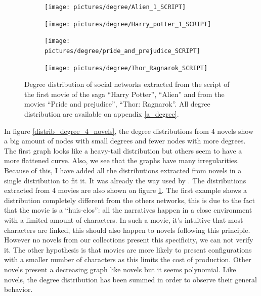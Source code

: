 \documentclass[a4paper, 12pt]{report}
\begin{document}
\begin{figure}
\begin{subfigure}{.49\textwidth}
\centering
\texttt{[image: pictures/degree/Alien\_1\_SCRIPT]}
\end{subfigure}
\hfill
\begin{subfigure}{.49\textwidth}
\centering
\texttt{[image: pictures/degree/Harry\_potter\_1\_SCRIPT]}
\end{subfigure}
\hfill
\begin{subfigure}{.49\textwidth}
\centering
\texttt{[image: pictures/degree/pride\_and\_prejudice\_SCRIPT]}
\end{subfigure}
\begin{subfigure}{.49\textwidth}
\centering
\texttt{[image: pictures/degree/Thor\_Ragnarok\_SCRIPT]}
\end{subfigure}
\caption{Degree distribution of social networks extracted from the script of the first movie of the saga ``Harry Potter'', ``Alien'' and from the movies ``Pride and prejudice'', ``Thor: Ragnarok''. All degree distribution are available on appendix \ref{a_degree}.}
\label{distrib_degree_4_scripts}
\end{figure}

In figure \ref{distrib_degree_4_novels}, the degree distributions from 4 novels show a big amount of nodes with small degrees and fewer nodes with more degrees. The first graph looks like a heavy-tail distribution but others seem to have a more flattened curve. Also, we see that the graphs have many irregularities. Because of this, I have added all the distributions extracted from novels in a single distribution to fit it. It was already the way used by \cite{original}.
The distributions extracted from 4 movies are also shown on figure \ref{distrib_degree_4_scripts}. The first example shows a distribution completely different from the others networks, this is due to the fact that the movie is a ``huis-clos'': all the narratives happen in a close environment with a limited amount of characters. In such a movie, it's intuitive that most characters are linked, this should also happen to novels following this principle. However no novels from our collections present this specificity, we can not verify it. The other hypothesis is that movies are more likely to present configurations with a smaller number of characters as this limits the cost of production. Other novels present a decreasing graph like novels but it seems polynomial. Like novels, the degree distribution has been summed in order to observe their general behavior. \\
\end{document}
